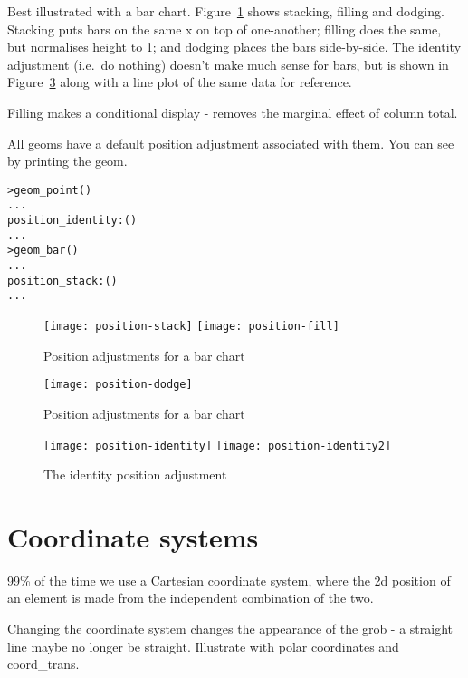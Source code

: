 Best illustrated with a bar chart.  Figure~\ref{fig:position-bar} shows stacking, filling and dodging.  Stacking puts bars on the same x on top of one-another; filling does the same, but normalises height to 1; and dodging places the bars side-by-side.  The identity adjustment (i.e.\ do nothing) doesn't make much sense for bars, but is shown in Figure~\ref{fig:position-identity} along with a line plot of the same data for reference.

Filling makes a conditional display - removes the marginal effect of column total. 

All geoms have a default position adjustment associated with them.  You can see by printing the geom.

\begin{alltt}
  > geom_point()
  ...
  position_identity: ()
  ...
  > geom_bar()
  ...
  position_stack: ()
  ...
\end{alltt}

\begin{figure}[htbp]
  \centering
    \texttt{[image: position-stack]}%
    \texttt{[image: position-fill]}
  \caption{Position adjustments for a bar chart}
  \label{fig:position-bar}
\end{figure}

\begin{figure}[htbp]
  \centering
    \texttt{[image: position-dodge]}
  \caption{Position adjustments for a bar chart}
  \label{fig:position-dodge}
\end{figure}

\begin{figure}[htbp]
  \centering
    \texttt{[image: position-identity]}%
    \texttt{[image: position-identity2]}
  \caption{The identity position adjustment}
  \label{fig:position-identity}
\end{figure}


\section{Coordinate systems}
\label{sec:coord}

99\% of the time we use a Cartesian coordinate system, where the 2d position of an element is made from the independent combination of the two.

Changing the coordinate system changes the appearance of the grob - a straight line maybe no longer be straight.  Illustrate with polar coordinates and coord\_trans.  

